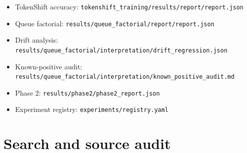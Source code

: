 \documentclass[11pt,a4paper,oneside]{report}
\begin{document}
\begin{itemize}
\item TokenShift accuracy: \texttt{tokenshift\_\linebreak[1]training/\linebreak[1]results/\linebreak[1]report/\linebreak[1]report.\linebreak[1]json}
\item Queue factorial: \texttt{results/\linebreak[1]queue\_\linebreak[1]factorial/\linebreak[1]report/\linebreak[1]report.\linebreak[1]json}
\item Drift analysis: \texttt{results/\linebreak[1]queue\_\linebreak[1]factorial/\linebreak[1]interpretation/\linebreak[1]drift\_\linebreak[1]regression.\linebreak[1]json}
\item Known-positive audit: \texttt{results/\linebreak[1]queue\_\linebreak[1]factorial/\linebreak[1]interpretation/\linebreak[1]known\_\linebreak[1]positive\_\linebreak[1]audit.\linebreak[1]md}
\item Phase 2: \texttt{results/\linebreak[1]phase2/\linebreak[1]phase2\_\linebreak[1]report.\linebreak[1]json}
\item Experiment registry: \texttt{experiments/\linebreak[1]registry.\linebreak[1]yaml}
\end{itemize}

\chapter{Search and source audit}
\end{document}
